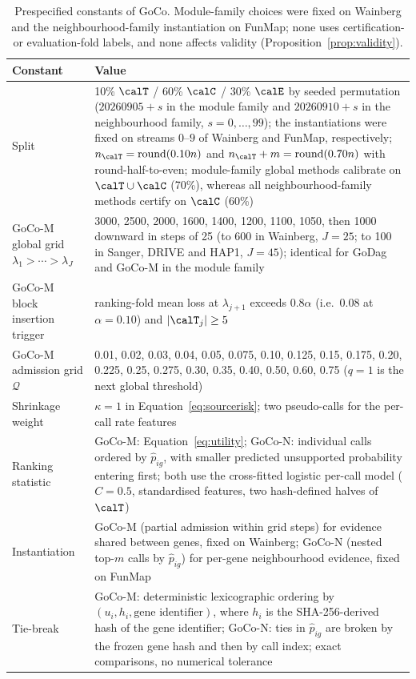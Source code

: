 \begin{table}[!t]
\centering
\caption{Prespecified constants of GoCo. Module-family choices were fixed on Wainberg and the neighbourhood-family instantiation on FunMap; none uses certification- or evaluation-fold labels, and none affects validity (Proposition~\ref{prop:validity}).}
\label{tab:constants}
\scriptsize
\begin{tabular}{p{} p{}}
\toprule
Constant & Value \\
\midrule
Split & 10\% $\calT$ / 60\% $\calC$ / 30\% $\calE$ by seeded permutation ($20260905+s$ in the module family and $20260910+s$ in the neighbourhood family, $s=0,\ldots,99$); the instantiations were fixed on streams $0$--$9$ of Wainberg and FunMap, respectively; $n_{\calT}=\operatorname{round}(0.10n)$ and $n_{\calT}+m=\operatorname{round}(0.70n)$ with round-half-to-even; module-family global methods calibrate on $\calT\cup\calC$ (70\%), whereas all neighbourhood-family methods certify on $\calC$ (60\%) \\
GoCo-M global grid $\lambda_1>\cdots>\lambda_J$ & 3000, 2500, 2000, 1600, 1400, 1200, 1100, 1050, then 1000 downward in steps of 25 (to 600 in Wainberg, $J=25$; to 100 in Sanger, DRIVE and HAP1, $J=45$); identical for GoDag and GoCo-M in the module family \\
GoCo-M block insertion trigger & ranking-fold mean loss at $\lambda_{j+1}$ exceeds $0.8\alpha$ (i.e.\ 0.08 at $\alpha=0.10$) and $|\calT_j|\ge5$ \\
GoCo-M admission grid $\mathcal Q$ & 0.01, 0.02, 0.03, 0.04, 0.05, 0.075, 0.10, 0.125, 0.15, 0.175, 0.20, 0.225, 0.25, 0.275, 0.30, 0.35, 0.40, 0.50, 0.60, 0.75 ($q=1$ is the next global threshold) \\
Shrinkage weight & $\kappa=1$ in Equation~\eqref{eq:sourcerisk}; two pseudo-calls for the per-call rate features \\
Ranking statistic & GoCo-M: Equation~\eqref{eq:utility}; GoCo-N: individual calls ordered by $\widehat p_{ig}$, with smaller predicted unsupported probability entering first; both use the cross-fitted logistic per-call model ($C=0.5$, standardised features, two hash-defined halves of $\calT$) \\
Instantiation & GoCo-M (partial admission within grid steps) for evidence shared between genes, fixed on Wainberg; GoCo-N (nested top-$m$ calls by $\widehat p_{ig}$) for per-gene neighbourhood evidence, fixed on FunMap \\
Tie-break & GoCo-M: deterministic lexicographic ordering by $(u_i,h_i,\text{gene identifier})$, where $h_i$ is the SHA-256-derived hash of the gene identifier; GoCo-N: ties in $\widehat p_{ig}$ are broken by the frozen gene hash and then by call index; exact comparisons, no numerical tolerance \\

\end{tabular}
\end{table}
